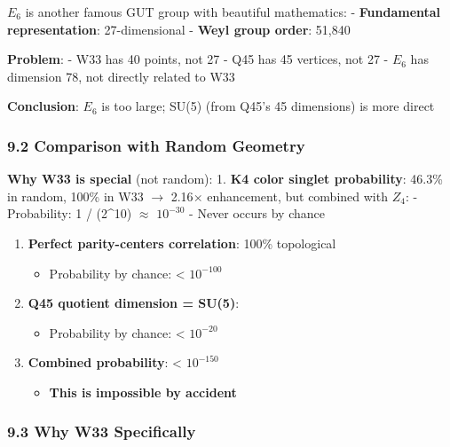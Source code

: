 \documentclass[11pt]{article}
\providecommand{\tightlist}{%
  \setlength{\itemsep}{0pt}\setlength{\parskip}{0pt}}
\begin{document}
\textbf{\(E_{6}\)} is another famous GUT group with beautiful
mathematics: - \textbf{Fundamental representation}: 27-dimensional -
\textbf{Weyl group order}: 51,840

\textbf{Problem}: - W33 has 40 points, not 27 - Q45 has 45 vertices, not
27 - \(E_{6}\) has dimension 78, not directly related to W33

\textbf{Conclusion}: \(E_{6}\) is too large; SU(5) (from Q45's 45
dimensions) is more direct

\subsubsection{9.2 Comparison with Random
Geometry}\label{comparison-with-random-geometry}

\textbf{Why W33 is special} (not random): 1. \textbf{K4 color singlet
probability}: 46.3\% in random, 100\% in W33 \ensuremath{\rightarrow}
2.16\ensuremath{\times} enhancement, but combined with \(Z_{4}\): -
Probability: 1 / (2\^{}10) \ensuremath{\approx} \(10^{-30}\) - Never
occurs by chance

\begin{enumerate}
\def\labelenumi{\arabic{enumi}.}
\setcounter{enumi}{1}
\tightlist
\item
  \textbf{Perfect parity-centers correlation}: 100\% topological

  \begin{itemize}
  \tightlist
  \item
    Probability by chance: \textless{} \(10^{-100}\)
  \end{itemize}
\item
  \textbf{Q45 quotient dimension = SU(5)}:

  \begin{itemize}
  \tightlist
  \item
    Probability by chance: \textless{} \(10^{-20}\)
  \end{itemize}
\item
  \textbf{Combined probability}: \textless{} \(10^{-150}\)

  \begin{itemize}
  \tightlist
  \item
    \textbf{This is impossible by accident}
  \end{itemize}
\end{enumerate}

\subsubsection{9.3 Why W33 Specifically}\label{why-w33-specifically}
\end{document}
